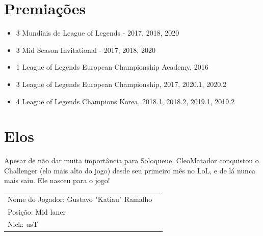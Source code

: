 \begin{multicols}{2}
	\section*{Premiações}
	\begin{itemize}
		\item 3 Mundiais de League of Legends - 2017, 2018, 2020
		\item 3 Mid Season Invitational - 2017, 2018, 2020
		\item 1 League of Legends European Championship Academy, 2016
		\item 3 League of Legends European Championship, 2017, 2020.1, 2020.2
		\item 4 League of Legends Champions Korea, 2018.1, 2018.2, 2019.1, 2019.2
	\end{itemize}
	
	\section*{Elos}
	Apesar de não dar muita importância para Soloqueue, CleoMatador conquistou o Challenger (elo mais alto do jogo) desde seu primeiro mês no LoL, e de lá nunca mais saiu. Ele nasceu para o jogo!
\end{multicols}

\newpage

\begin{tabularx}{\linewidth}{@{}m{} m{}@{}}
	\large{Nome do Jogador: Gustavo "Katiau" Ramalho} \\
	\large{Posição: Mid laner}\\
	\large{Nick: usT}
\end{tabularx}

